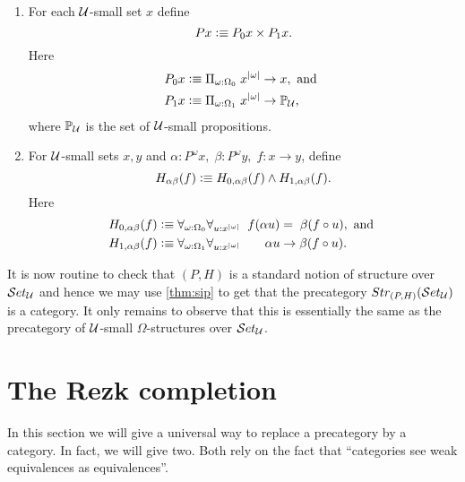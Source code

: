 \begin{defn}\label{defn:fo-notion-of-structure}
\mbox{}
\begin{enumerate}
\item For each $\mathcal{U}$-small set $x$ define 
  \[ Px \vcentcolon\equiv P_0x\times P_1x.\]
  Here
  \begin{align*}
    P_0x &\vcentcolon\equiv \Pi_{\omega:\Omega_0}\; x^{|\omega|}\to x, \mbox{ and } \\
    P_1x &\vcentcolon\equiv \Pi_{\omega:\Omega_1}\; x^{|\omega|}\to \mathbb{P}_\mathcal{U},
  \end{align*}
  where $\mathbb{P}_\mathcal{U}$ is the set of $\mathcal{U}$-small propositions.
\item For $\mathcal{U}$-small sets $x,y$ and 
  $\alpha:P^\omega x,\;\beta:P^\omega y,\; f:x\to y$, define
  \[ H_{\alpha\beta}(f) \vcentcolon\equiv H_{0,\alpha\beta}(f)\wedge H_{1,\alpha\beta}(f).\]
  Here
  \begin{align*}
    H_{0,\alpha\beta}(f) &\vcentcolon\equiv
    \forall_{\omega:\Omega_0}\forall_{u:x^{|\omega|}}\;\; f(\alpha u)=\;\beta(f\circ u),
    \mbox{ and }\\
    H_{1,\alpha\beta}(f) &\vcentcolon\equiv
    \forall_{\omega:\Omega_1}\forall_{u:x^{|\omega|}}\;\;\;\;\;\;\;\alpha u\to\beta(f\circ u).
  \end{align*}
\end{enumerate}
\end{defn}

It is now routine to check that $(P,H)$ is a standard notion of structure over $\mathcal{S}et_\mathcal{U}$ and hence we may use \autoref{thm:sip} to get that the precategory $Str_{(P,H)}(\mathcal{S}et_\mathcal{U})$ is a category.  It only remains to observe that this is essentially the same as the precategory of $\mathcal{U}$-small $\Omega$-structures over $\mathcal{S}et_\mathcal{U}$.


\section{The Rezk completion}
\label{sec:rezk}

In this section we will give a universal way to replace a precategory by a category.
In fact, we will give two.
Both rely on the fact that ``categories see weak equivalences as equivalences''.

